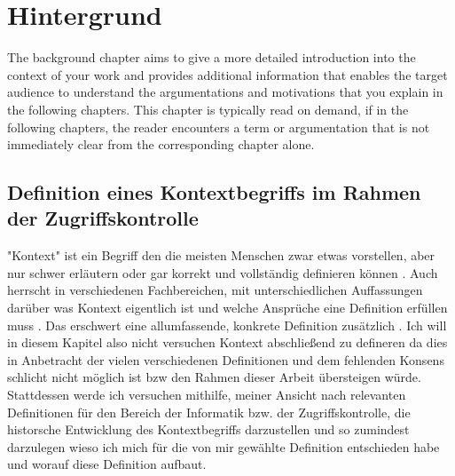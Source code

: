 
\chapter{Hintergrund}%
\label{cha:background}

The background chapter aims to give a more detailed introduction into the context of your work and provides additional information that enables the target audience to understand the argumentations and motivations that you explain in the following chapters.
This chapter is typically read on demand, if in the following chapters, the reader encounters a term or argumentation that is not immediately clear from the corresponding chapter alone.

\section{Definition eines Kontextbegriffs im Rahmen der Zugriffskontrolle}


"Kontext" ist ein Begriff den die meisten Menschen zwar etwas vorstellen, aber nur schwer erläutern oder gar korrekt und vollständig definieren können \cite{dey_understanding_2001}. Auch herrscht in verschiedenen Fachbereichen, mit unterschiedlichen Auffassungen darüber was  Kontext eigentlich ist und welche Ansprüche eine Definition erfüllen muss . Das erschwert eine allumfassende, konkrete Definition zusätzlich \cite{hutchison_understanding_2005}. Ich will in diesem Kapitel also nicht versuchen Kontext abschließend zu defineren da dies in Anbetracht der vielen verschiedenen Definitionen und dem fehlenden Konsens \cite{wei_liu_survey_2011,alegre_engineering_2016} schlicht nicht möglich ist bzw den Rahmen dieser Arbeit übersteigen würde. Stattdessen werde ich versuchen mithilfe, meiner Ansicht nach relevanten Definitionen für den Bereich der Informatik bzw. der Zugriffskontrolle, die historsche Entwicklung des Kontextbegriffs darzustellen und so zumindest darzulegen wieso ich mich für die von mir gewählte Definition entschieden habe und worauf diese  Definition aufbaut.

